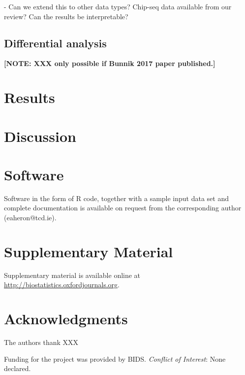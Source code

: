 \documentclass[oupdraft]{bio}
\newcommand{\note}[1]{\textbf{[NOTE: #1]}}
\begin{document}
- Can we extend this to other data types? Chip-seq data available from our
review? Can the results be interpretable?

\subsection{Differential analysis}
\note{XXX only possible if Bunnik 2017 paper published.}

\section{Results}
\label{sec3}

\section{Discussion}
\label{sec4}



\section{Software}
\label{sec5}

Software in the form of R code, together with a sample
input data set and complete documentation is available on
request from the corresponding author (eaheron@tcd.ie).


\section{Supplementary Material}
\label{sec6}

Supplementary material is available online at
\url{http://biostatistics.oxfordjournals.org}.


\section*{Acknowledgments}

The authors thank XXX

Funding for the project was provided by BIDS.
{\it Conflict of Interest}: None declared.






\begin{figure}[!p]
\centering
\caption{}
\label{Fig1}
\end{figure}
\end{document}
